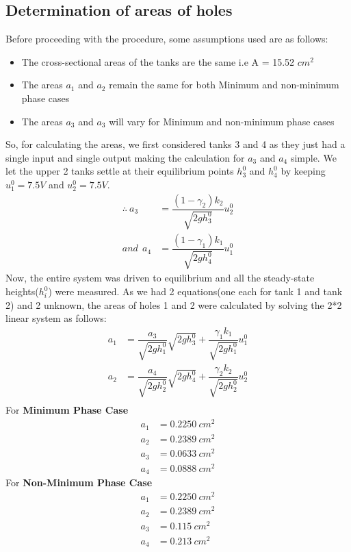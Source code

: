 \documentclass[10pt,a4paper, twocolumn]{article}
\begin{document}
\subsection{Determination of areas of holes}
Before proceeding with the procedure, some assumptions used are as follows:
\begin{itemize}
\item The cross-sectional areas of the tanks are the same i.e A = 15.52 $cm^2$
\item The areas $a_1$ and $a_2$ remain the same for both Minimum and non-minimum phase cases
\item The areas $a_3$ and $a_3$ will vary for Minimum and non-minimum phase cases
\end{itemize}
So, for calculating the areas, we first considered tanks 3 and 4 as they just had a single input and single output making the calculation for $a_3$ and $a_4$ simple. We let the upper 2 tanks settle at their equilibrium points $h_3^0$ and $h_4^0$ by keeping $u_1^0 = 7.5V$ and $u_2^0 = 7.5V$. 
\begin{align*}
\therefore \ a_3 &= \dfrac{(1- \gamma _2) k_2}{\sqrt{2gh_3^0}}u_2^0\\ 
and \ 
\ a_4 &= \dfrac{(1- \gamma _1) k_1}{\sqrt{2gh_4^0}}u_1^0
\end{align*}
Now, the entire system was driven to equilibrium and all the steady-state heights($h_i^0$) were measured. As we had 2 equations(one each for tank 1 and tank 2) and 2 unknown, the areas of holes 1 and 2 were calculated by solving the 2*2 linear system as follows:
\begin{align*}
a_1 &= \dfrac{a_3}{\sqrt{2gh_1^0}} \sqrt{2gh_3^0} + \dfrac{\gamma _1 k_1}{\sqrt{2gh_1^0}}u_1^0 \\
a_2 &= \dfrac{a_4}{\sqrt{2gh_2^0}} \sqrt{2gh_4^0} + \dfrac{\gamma _2 k_2}{\sqrt{2gh_2^0}}u_2^0 \\
\end{align*}
For \textbf{Minimum Phase Case}
\begin{align*}
a_1 &= 0.2250 \ cm^2\\
a_2 &= 0.2389 \ cm^2\\
a_3 &= 0.0633 \ cm^2\\
a_4 &= 0.0888 \ cm^2
\end{align*}
For \textbf{Non-Minimum Phase Case}
\begin{align*}
a_1 &= 0.2250 \ cm^2\\
a_2 &= 0.2389 \ cm^2\\
a_3 &= 0.115 \ cm^2\\
a_4 &= 0.213 \ cm^2
\end{align*}
\end{document}
